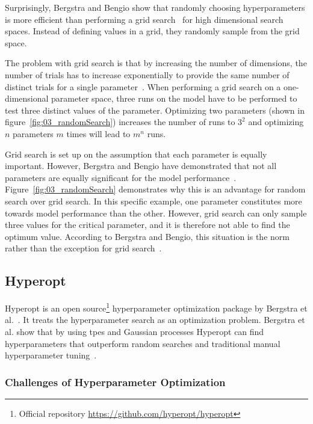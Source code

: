 Surprisingly, Bergstra and Bengio show that randomly choosing hyperparameters is more efficient than performing a grid search~\cite{Bergstra2012a} for high dimensional search spaces. Instead of defining values in a grid, they randomly sample from the grid space.

The problem with grid search is that by increasing the number of dimensions, the number of trials has to increase exponentially to provide the same number of distinct trials for a single parameter~\cite{Bergstra2012a}. When performing a grid search on a one-dimensional parameter space, three runs on the model have to be performed to test three distinct values of the parameter. Optimizing two parameters {(shown in figure~\ref{fig:03_randomSearch})} increases the number of runs to $3^2$ and optimizing $n$ parameters $m$ times will lead to $m^n$ runs. 

Grid search is set up on the assumption that each parameter is equally important. However, Bergstra and Bengio have demonstrated that not all parameters are equally significant for the model performance~\cite{Bergstra2012a}. Figure~\ref{fig:03_randomSearch} demonstrates why this is an advantage for random search over grid search. In this specific example, one parameter constitutes more towards model performance than the other. However, grid search can only sample three values for the critical parameter, and it is therefore not able to find the optimum value. According to Bergstra and Bengio, this situation is the norm rather than the exception for grid search~\cite{Bergstra2012a}.

\subsection{Hyperopt}

Hyperopt is an open source\footnote{Official repository \url{https://github.com/hyperopt/hyperopt}} hyperparameter optimization package by Bergstra et al.~\cite{Bergstra2013a}. It treats the hyperparameter search as an optimization problem. Bergstra et al. show that by using \glspl{tpe} and Gaussian processes Hyperopt can find hyperparameters that outperform random searches and traditional manual hyperparameter tuning~\cite{Bergstra2011}.




\subsubsection*{Challenges of Hyperparameter Optimization}

